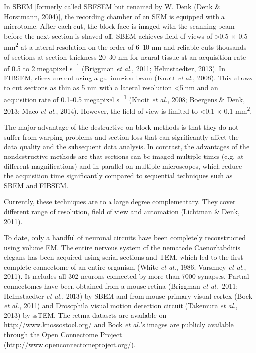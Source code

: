 \documentclass{article}
\begin{document}
In SBEM [formerly called SBFSEM but renamed by W. Denk (Denk \& Horstmann, 2004)], the recording chamber of an SEM is equipped with a microtome. After each cut, the block-face is imaged with the scanning beam before the next section is shaved off. SBEM achieves field of views of >0.5 × 0.5 mm\textsuperscript{2} at a lateral resolution on the order of 6–10 nm and reliable cuts thousands of sections at section thickness 20–30 nm for neural tissue at an acquisition rate of 0.5 to 2 megapixel s\textsuperscript{−1} (Briggman \emph{et al.}, 2011; Helmstaedter, 2013). In FIBSEM, slices are cut using a gallium-ion beam (Knott \emph{et al.}, 2008). This allows to cut sections as thin as 5 nm with a lateral resolution <5 nm and an acquisition rate of 0.1–0.5 megapixel s\textsuperscript{−1} (Knott \emph{et al.}, 2008; Boergens \& Denk, 2013; Maco \emph{et al.}, 2014). However, the field of view is limited to <0.1 × 0.1 mm\textsuperscript{2}.

The major advantage of the destructive on-block methods is that they do not suffer from warping problems and section loss that can significantly affect the data quality and the subsequent data analysis. In contrast, the advantages of the nondestructive methods are that sections can be imaged multiple times (e.g. at different magnifications) and in parallel on multiple microscopes, which reduce the acquisition time significantly compared to sequential techniques such as SBEM and FIBSEM.

Currently, these techniques are to a large degree complementary. They cover different range of resolution, field of view and automation (Lichtman \& Denk, 2011).

To date, only a handful of neuronal circuits have been completely reconstructed using volume EM. The entire nervous system of the nematode Caenorhabditis elegans has been acquired using serial sections and TEM, which led to the first complete connectome of an entire organism (White \emph{et al.}, 1986; Varshney \emph{et al.}, 2011). It includes all 302 neurons connected by more than 7000 synapses. Partial connectomes have been obtained from a mouse retina (Briggman \emph{et al.}, 2011; Helmstaedter \emph{et al.}, 2013) by SBEM and from mouse primary visual cortex (Bock \emph{et al.}, 2011) and Drosophila visual motion detection circuit (Takemura \emph{et al.}, 2013) by ssTEM. The retina datasets are available on http://www.knossostool.org/ and Bock \emph{et al.}’s images are publicly available through the Open Connectome Project (http://www.openconnectomeproject.org/).
\end{document}
